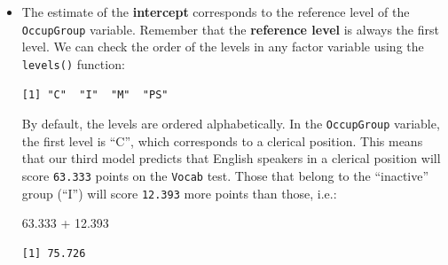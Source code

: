 \documentclass[
  letterpaper,
  DIV=11,
  numbers=noendperiod]{scrreprt}
\newenvironment{Shaded}{\begin{snugshade}}{\end{snugshade}}
\newcommand{\FloatTok}[1]{\textcolor[rgb]{0.68,0.00,0.00}{#1}}
\newcommand{\FunctionTok}[1]{\textcolor[rgb]{0.28,0.35,0.67}{#1}}
\newcommand{\NormalTok}[1]{\textcolor[rgb]{0.00,0.23,0.31}{#1}}
\newcommand{\SpecialCharTok}[1]{\textcolor[rgb]{0.37,0.37,0.37}{#1}}
\begin{document}
\begin{itemize}
\item
  The estimate of the \textbf{intercept} corresponds to the reference
  level of the \texttt{OccupGroup} variable. Remember that the
  \textbf{reference level} is always the first level. We can check the
  order of the levels in any factor variable using the \texttt{levels()}
  function:

\begin{Shaded}
\end{Shaded}

\begin{verbatim}
[1] "C"  "I"  "M"  "PS"
\end{verbatim}

  By default, the levels are ordered alphabetically. In the
  \texttt{OccupGroup} variable, the first level is ``C'', which
  corresponds to a clerical position. This means that our third model
  predicts that English speakers in a clerical position will score
  \texttt{63.333} points on the \texttt{Vocab} test. Those that belong
  to the ``inactive'' group (``I'') will score \texttt{12.393} more
  points than those, i.e.:

\begin{Shaded}
\begin{Highlighting}[]
\FloatTok{63.333} \SpecialCharTok{+} \FloatTok{12.393}
\end{Highlighting}
\end{Shaded}

\begin{verbatim}
[1] 75.726
\end{verbatim}


\end{itemize}
\end{document}
